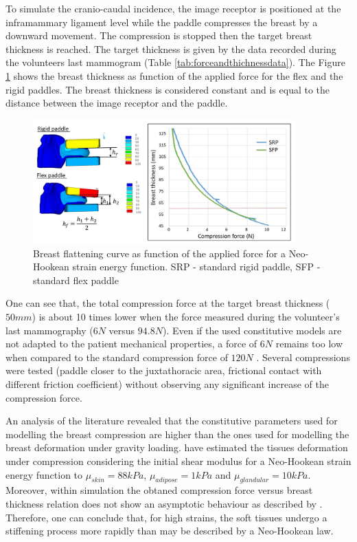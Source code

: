 To simulate the cranio-caudal incidence, the image receptor is positioned at the inframammary ligament level while the paddle compresses the breast by a downward movement. The compression is stopped then the target breast thickness is reached. The target thickness is given by the data recorded during the volunteers last mammogram (Table \ref{tab:forceandthichnessdata}). The Figure \ref{fig:thicknessforcerelationNH} shows the breast thickness as function of the applied force for the flex and the rigid paddles. The breast thickness is considered constant and is equal to the distance between the image receptor and the paddle. 
 
\begin{figure}[!h]
\centering
\includegraphics[width=0.9\textwidth,keepaspectratio]{figures/compressionforceNH.jpg} 
\caption{Breast flattening curve as function of the applied force for a Neo-Hookean strain energy function. SRP - standard rigid paddle, SFP -standard flex paddle}\label{fig:thicknessforcerelationNH}
\end{figure}

One can see that, the total compression force at the target breast thickness ($50mm$) is about 10 times lower when the force measured during the volunteer's last mammography ($6N$ versus $94.8N$). Even if the used constitutive models are not adapted to the patient mechanical properties, a force of $6N$ remains too low when compared to the standard compression force of $120N$ \citep{chida_reduced_2009}.   Several compressions were tested (paddle closer to the juxtathoracic area, frictional contact with different friction coefficient) without observing any significant increase of the compression force. 

An analysis of the literature revealed that the constitutive parameters used for modelling the breast compression are higher than the ones used for modelling the breast deformation under gravity loading.  \cite{sturgeon_finite_element_2016} have estimated the tissues deformation under compression considering the initial shear modulus for a Neo-Hookean strain energy function to $\mu_{skin} = 88kPa$, $\mu_{adipose} = 1kPa$ and $\mu_{glandular}= 10kPa$. Moreover, within simulation the obtaned compression force versus breast thickness relation does not show an asymptotic behaviour as described by \cite{de_pain_2015}.  Therefore, one can conclude that, for high strains, the soft tissues undergo a stiffening process more rapidly than may be described by a Neo-Hookean law.

